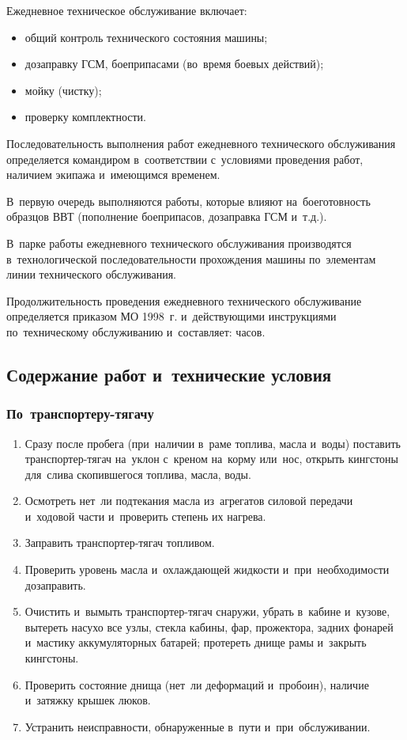 Ежедневное техническое обслуживание включает:
\begin{itemize}
    \item общий контроль технического состояния машины; 
    \item дозаправку ГСМ, боеприпасами (во~время боевых действий);
    \item мойку (чистку);
    \item проверку комплектности.
\end{itemize}

Последовательность выполнения работ ежедневного технического обслуживания определяется командиром в~соответствии с~условиями проведения работ, наличием экипажа и~имеющимся временем. 

В~первую очередь выполняются работы, которые влияют на~боеготовность образцов ВВТ (пополнение боеприпасов, дозаправка ГСМ и~т.д.). 

В~парке работы ежедневного технического обслуживания производятся в~технологической последовательности прохождения машины по~элементам линии технического обслуживания.

Продолжительность проведения ежедневного технического обслуживание определяется приказом МО 1998~г. и~действующими инструкциями по~техническому обслуживанию и~составляет:  часов.


\subsection{Содержание работ и~технические условия}
\subsubsection{По~транспортеру-тягачу}
\begin{enumerate}
    \item Сразу после пробега (при~наличии в~раме топлива, масла и~воды) поставить транспортер-тягач на~уклон с~креном на~корму или~нос, открыть кингстоны для~слива скопившегося топлива, масла, воды. 
    \item Осмотреть нет~ли подтекания масла из~агрегатов силовой передачи и~ходовой части и~проверить степень их нагрева. 
    \item Заправить транспортер-тягач топливом. 
    \item Проверить уровень масла и~охлаждающей жидкости и~при~необходимости дозаправить. 
    \item Очистить и~вымыть транспортер-тягач снаружи, убрать в~кабине и~кузове, вытереть насухо все узлы, стекла кабины, фар, прожектора, задних фонарей и~мастику аккумуляторных батарей; протереть днище рамы и~закрыть кингстоны.
    \item Проверить состояние днища (нет~ли деформаций и~пробоин), наличие и~затяжку крышек люков. 
    \item Устранить неисправности, обнаруженные в~пути и~при~обслуживании. 
\end{enumerate}

